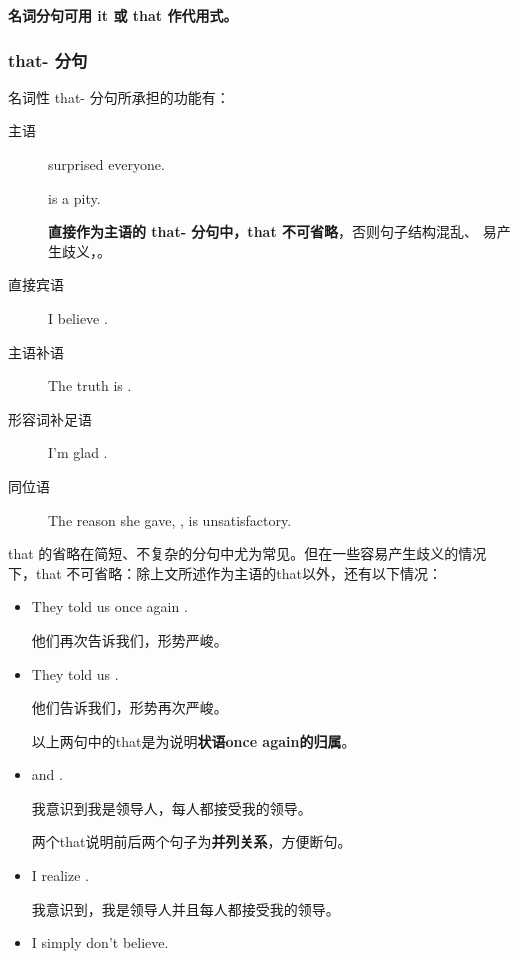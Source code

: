 \textbf{名词分句可用 it 或 that 作代用式。}

\subsubsection{that- 分句}
\label{subsubsec:thatclause}

名词性 that- 分句所承担的功能有：
\begin{description}
\item[主语]  surprised everyone.

   is a pity.

  \textbf{直接作为主语的 that- 分句中，that 不可省略}，否则句子结构混乱、
  易产生歧义，。

\item[直接宾语] I believe .
\item[主语补语] The truth is .
\item[形容词补足语] I'm glad .

\item[同位语] The reason she gave, , is unsatisfactory.

\end{description}

that 的省略在简短、不复杂的分句中尤为常见。但在一些容易产生歧义的情况
下，that 不可省略：除上文所述作为主语的that以外，还有以下情况：
\begin{itemize}
\item  They told us once again .

  他们再次告诉我们，形势严峻。

\item They told us .

  他们告诉我们，形势再次严峻。

  以上两句中的that是为说明\textbf{状语once again的归属}。

\item {} and .

  我意识到我是领导人，每人都接受我的领导。

  两个that说明前后两个句子为\textbf{并列关系}，方便断句。

\item I realize .

  我意识到，我是领导人并且每人都接受我的领导。

\item {} I simply don't believe.

\end{itemize}

